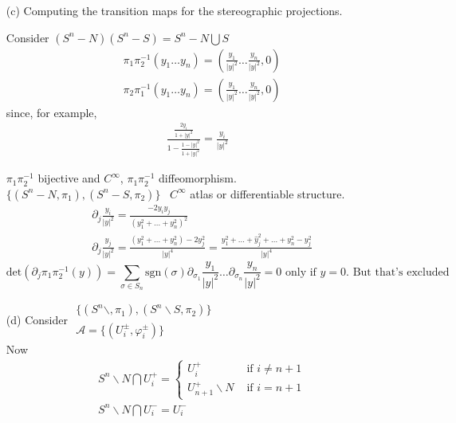 \begin{enumerate}
\item[(c)] Computing the transition maps for the stereographic projections.


Consider $(S^n - N)(S^n-S) = S^n - N \bigcup S$ 
\[
\begin{aligned}
  & \pi_1 \pi_2^{-1}(y_1 \dots y_n) = \left( \frac{y_1 }{ |y|^2} \dots \frac{y_n}{|y|^2} , 0 \right) \\ 
  & \pi_2 \pi_1^{-1}(y_1 \dots y_n) = \left( \frac{y_1 }{ |y|^2} \dots \frac{y_n}{|y|^2} , 0 \right) 
\end{aligned}
\]
since, for example, 
\[
\begin{gathered}
\frac{   \frac{2y_i }{ 1 + |y|^2} }{ 1 - \frac{ 1 - |y|^2}{ 1 + |y|^2 }} = \frac{y_i }{ |y|^2 }
\end{gathered}
\]



$\pi_1 \pi_2^{-1}$ bijective and $C^{\infty}$, $\pi_1 \pi_2^{-1}$ diffeomorphism.   \\

$\lbrace (S^n-N, \pi_1), (S^n - S, \pi_2) \rbrace$ \, $C^{\infty}$ atlas or differentiable structure.  
\[
\begin{aligned}
  & \partial_j \frac{y_i}{ |y|^2} = \frac{ - 2y_i y_j }{ (y_1^2 + \dots + y_n^2 )^2 } \\ 
  & \partial_j \frac{ y_j}{ |y|^2} = \frac{ (y_1^2 + \dots + y_n^2) - 2y_j^2 }{ |y|^4} = \frac{ y_1^2 + \dots + \widehat{y}_j^2 + \dots + y_n^2 - y_j^2 }{ |y|^4}
\end{aligned}
\]
\[
\text{det}{ (\partial_j \pi_1 \pi_2^{-1}(y) ) } = \sum_{ \sigma \in S_n} \text{sgn}{ (\sigma)} \partial_{\sigma_1} \frac{y_1}{ |y|^2} \dots \partial_{\sigma_n} \frac{y_n}{|y|^2} = 0 \text{ only if $y=0$. But that's excluded }
\]
\item[(d)] Consider $\begin{gathered}
  \lbrace ( S^n\backslash, \pi_1), (S^n \backslash S, \pi_2) \rbrace \\ 
  \mathcal{A} = \lbrace (U_i^{\pm}, \varphi_i^{\pm}) \rbrace \end{gathered}$  \\

Now 
\[
\begin{aligned}
  & S^n \backslash N \bigcap U_i^+ = \begin{cases} U_i^+ & \text{ if } i \neq n + 1 \\ U_{n+1}^+ \backslash N & \text{ if } i = n+1 \end{cases} \\ 
  & S^n \backslash N \bigcap U_i^- = U_i^-
\end{aligned}
\]


\end{enumerate}
